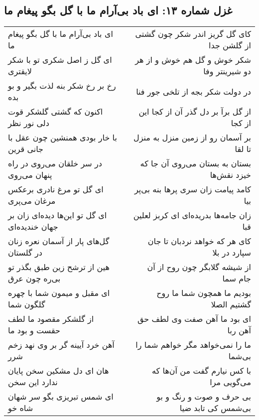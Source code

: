 \begin{center}
\section*{غزل شماره ۱۳: ای باد بی‌آرام ما با گل بگو پیغام ما}
\label{sec:0013}
\begin{longtable}{l p{0.5cm} r}
ای باد بی‌آرام ما با گل بگو پیغام ما
&&
کای گل گریز اندر شکر چون گشتی از گلشن جدا
\\
ای گل ز اصل شکری تو با شکر لایقتری
&&
شکر خوش و گل هم خوش و از هر دو شیرینتر وفا
\\
رخ بر رخ شکر بنه لذت بگیر و بو بده
&&
در دولت شکر بجه از تلخی جور فنا
\\
اکنون که گشتی گلشکر قوت دلی نور نظر
&&
از گل برآ بر دل گذر آن از کجا این از کجا
\\
با خار بودی همنشین چون عقل با جانی قرین
&&
بر آسمان رو از زمین منزل به منزل تا لقا
\\
در سر خلقان می‌روی در راه پنهان می‌روی
&&
بستان به بستان می‌روی آن جا که خیزد نقش‌ها
\\
ای گل تو مرغ نادری برعکس مرغان می‌پری
&&
کامد پیامت زان سری پرها بنه بی‌پر بیا
\\
ای گل تو این‌ها دیده‌ای زان بر جهان خندیده‌ای
&&
زان جامه‌ها بدریده‌ای ای کربز لعلین قبا
\\
گل‌های پار از آسمان نعره زنان در گلستان
&&
کای هر که خواهد نردبان تا جان سپارد در بلا
\\
هین از ترشح زین طبق بگذر تو بی‌ره چون عرق
&&
از شیشه گلابگر چون روح از آن جام سما
\\
ای مقبل و میمون شما با چهره گلگون شما
&&
بودیم ما همچون شما ما روح گشتیم الصلا
\\
از گلشکر مقصود ما لطف حقست و بود ما
&&
ای بود ما آهن صفت وی لطف حق آهن ربا
\\
آهن خرد آیینه گر بر وی نهد زخم شرر
&&
ما را نمی‌خواهد مگر خواهم شما را بی‌شما
\\
هان ای دل مشکین سخن پایان ندارد این سخن
&&
با کس نیارم گفت من آن‌ها که می‌گویی مرا
\\
ای شمس تبریزی بگو سر شهان شاه خو
&&
بی حرف و صوت و رنگ و بو بی‌شمس کی تابد ضیا
\\
\end{longtable}
\end{center}
